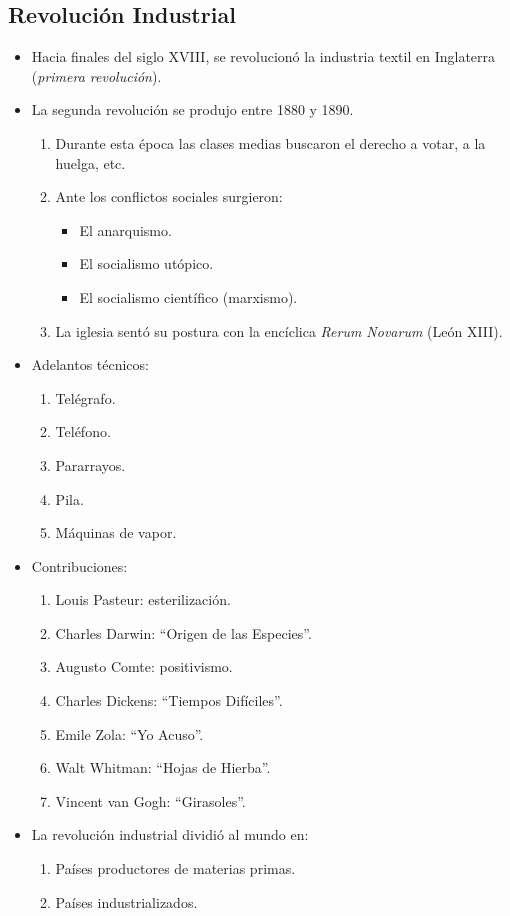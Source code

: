 \subsection{Revolución Industrial}

\begin{itemize}

\item Hacia finales del siglo XVIII, se revolucionó la industria textil en Inglaterra (\emph{primera revolución}).

\item La segunda revolución se produjo entre 1880 y 1890.
\begin{enumerate}
	\item Durante esta época las clases medias buscaron el derecho a votar, a la huelga, etc.
	\item Ante los conflictos sociales surgieron:
	\begin{itemize}
		\item El anarquismo.
		\item El socialismo utópico.
		\item El socialismo científico (marxismo).
	\end{itemize}
	\item La iglesia sentó su postura con la encíclica \emph{Rerum Novarum} (León XIII).
\end{enumerate}

\item Adelantos técnicos:
\begin{enumerate}
	\item Telégrafo.
	\item Teléfono.
	\item Pararrayos.
	\item Pila.
	\item Máquinas de vapor.
\end{enumerate}

\item Contribuciones:
\begin{enumerate}
	\item Louis Pasteur: esterilización.
	\item Charles Darwin: ``Origen de las Especies''.
	\item Augusto Comte: positivismo.
	\item Charles Dickens: ``Tiempos Difíciles''.
	\item Emile Zola: ``Yo Acuso''.
	\item Walt Whitman: ``Hojas de Hierba''.
	\item Vincent van Gogh: ``Girasoles''.
\end{enumerate}

\item La revolución industrial dividió al mundo en:
\begin{enumerate}
	\item Países productores de materias primas.
	\item Países industrializados.
\end{enumerate}

\end{itemize}
